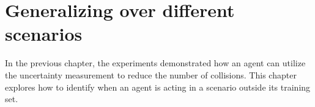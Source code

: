 \chapter{Generalizing over different scenarios} \label{ch:generalize}



In the previous chapter, the experiments demonstrated how an agent can utilize the uncertainty measurement to reduce the number of collisions. This chapter explores how to identify when an agent is acting in a scenario outside its training set.

